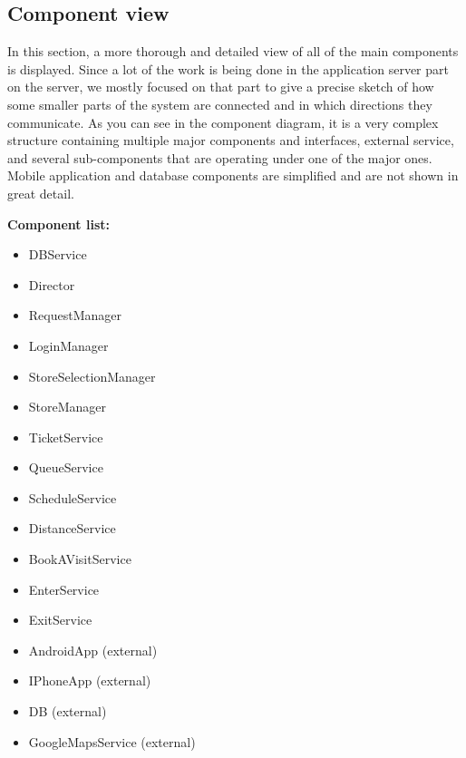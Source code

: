 \newpage 

\subsection{Component view}
\label{sec:componentview}

In this section, a more thorough and detailed view of all of the main components is displayed. Since a lot of the work is being done in the application server part on the server, we mostly focused on that part to give a precise sketch of how some smaller parts of the system are connected and in which directions they communicate. As you can see in the component diagram, it is a very complex structure containing multiple major components and interfaces, external service, and several sub-components that are operating under one of the major ones. Mobile application and database components are simplified and are not shown in great detail. \newline

\textbf{Component list:}
\begin{itemize}
\item DBService
\item Director
\item RequestManager
\item LoginManager 
\item StoreSelectionManager 
\item StoreManager
\item TicketService 
\item QueueService 
\item ScheduleService
\item DistanceService 
\item BookAVisitService
\item EnterService 
\item ExitService 
\item AndroidApp (external) 
\item IPhoneApp (external)
\item DB (external) 
\item GoogleMapsService (external) 
\end{itemize}

\newpage

